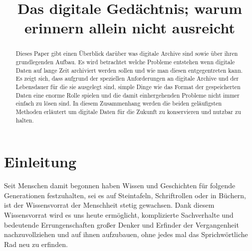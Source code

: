 \documentclass[conference,compsoc,final,a4paper]{IEEEtran}
\newcommand{\autoren}[0]{Nockel, Sascha}
\newcommand{\dokumententitel}[0]{Das digitale Gedächtnis; warum erinnern allein nicht ausreicht}
\begin{document}
\title{\dokumententitel}

\author{
  \IEEEauthorblockN{\autoren}
}

\maketitle
\thispagestyle{plain}
\pagestyle{plain}


\begin{abstract}
Dieses Paper gibt einen Überblick darüber was digitale Archive sind sowie über ihren grundlegenden Aufbau. Es wird betrachtet welche Probleme entstehen wenn digitale Daten auf lange Zeit archiviert werden sollen und wie man diesen entgegentreten kann. Es zeigt sich, dass aufgrund der speziellen Anforderungen an digitale Archive und der Lebensdauer für die sie ausgelegt sind, simple Dinge wie das Format der gespeicherten Daten eine enorme Rolle spielen und die damit einhergehenden Probleme nicht immer einfach zu lösen sind. In diesem Zusammenhang werden die beiden geläufigsten Methoden erläutert um digitale Daten für die Zukunft zu konservieren und nutzbar zu halten.

\end{abstract}

{\small\tableofcontents}

\section{Einleitung}
Seit Menschen damit begonnen haben Wissen und Geschichten für folgende Generationen festzuhalten, sei es auf Steintafeln, Schriftrollen oder in Büchern, ist der Wissensvorrat der Menschheit stetig gewachsen. Dank diesem Wissensvorrat wird es uns heute ermöglicht, komplizierte Sachverhalte und bedeutende Errungenschaften großer Denker und Erfinder der Vergangenheit nachzuvollziehen und auf ihnen aufzubauen, ohne jedes mal das Sprichwörtliche Rad neu zu erfinden.
\end{document}
